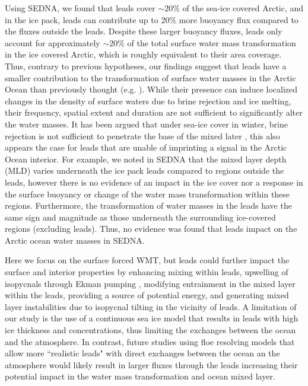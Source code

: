 \documentclass[lineno,sn-basic]{sn-jnl}%
\begin{document}
Using SEDNA, we found that leads cover $\sim 20\%$ of the sea-ice covered Arctic, and in the ice pack, leads can contribute up to 20\% more buoyancy flux compared to the fluxes outside the leads. Despite these larger buoyancy fluxes, leads only account for approximately $\sim 20\%$ of the total surface water mass transformation in the ice covered Arctic, which is roughly equivalent to their area coverage. Thus, contrary to previous hypotheses, our findings suggest that leads have a smaller contribution to the transformation of surface water masses in the Arctic Ocean than previously thought (e.g. \citealp{Hutter_identification_2019, McPhee_LKF_2005}). While their presence can induce localized changes in the density of surface waters due to brine rejection and ice melting, their frequency, spatial extent and duration are not sufficient to significantly alter the water masses. It has been argued that under sea-ice cover in winter, brine rejection is not sufficient to penetrate the base of the mixed later \citep{Lenn_mixing_2022}, this also appears the case for leads that are unable of imprinting a signal in the Arctic Ocean interior. For example, we noted in SEDNA that the mixed layer depth (MLD) varies underneath the ice pack leads compared to regions outside the leads, however there is no evidence of an impact in the ice cover nor a response in the surface buoyancy or change of the water mass transformation within these regions. Furthermore, the transformation of water masses in the leads have the same sign and magnitude as those underneath the surrounding ice-covered regions (excluding leads). Thus, no evidence was found that leads impact on the Arctic ocean water masses in SEDNA.

Here we focus on the surface forced WMT, but leads could further impact the surface and interior properties by enhancing mixing within leads, upwelling of isopycnals through Ekman pumping \citep{McPhee_LKF_2005}, modifying  entrainment in the mixed layer within the leads, providing a source of potential energy, and generating mixed layer instabilities due to isopycnal tilting in the vicinity of leads.  A limitation of our study is the use of a continuous sea ice model that results in leads with high ice thickness and concentrations, thus limiting the exchanges between the ocean and the atmosphere. In contrast, future studies using floe resolving models that allow more ``realistic leads" with direct exchanges between the ocean an the atmosphere would likely result in larger fluxes through the leads increasing their potential impact in the water mass transformation and ocean mixed layer.
\end{document}
